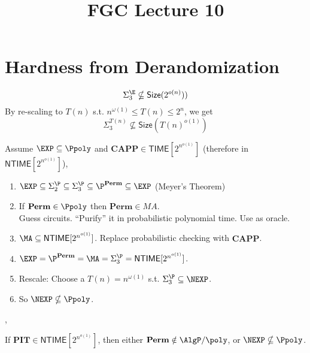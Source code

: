 \documentclass[letterpaper, 12pt]{article}
\newcommand{\Perm}{\mathbf{Perm}}
\newcommand{\CAPP}{\mathbf{CAPP}}
\newcommand{\PIT}{\mathbf{PIT}}
\newcommand{\Time}[1]{\mathsf{TIME}[#1]}
\newcommand{\NTime}[1]{\mathsf{NTIME}[#1]}
\newcommand{\Size}[1]{\mathsf{Size}(#1)}
\newcommand{\subexp}{2^{n^{o(1)}}}
\begin{document}
	\title{FGC Lecture 10}
	\date{}
	\maketitle

\section{Hardness from Derandomization}

\[\Sigma_3^\E \nsubseteq \Size{2^{o(n)})}\]
By re-scaling to $T(n)$ s.t. $n^{\omega(1)} \leq T(n) \leq 2^n$, we get
\[\Sigma_3^{T(n)} \nsubseteq \Size{T(n)^{o(1)}}\]


Assume $\EXP \subseteq \Ppoly$ and $\CAPP \in \Time{\subexp}$ (therefore in $\NTime{\subexp}$),
\begin{enumerate}[a]
	\item $\EXP \subseteq \Sigma_2^\P \subseteq \Sigma_3^\P \subseteq \P^\Perm \subseteq \EXP$ (Meyer's Theorem)
	\item If $\Perm \in \Ppoly$ then $\Perm \in MA$.\\
	Guess circuits. ``Purify'' it in probabilistic polynomial time. Use as oracle.
	\item $\MA \subseteq \NTime{\subexp}$. Replace probabilistic checking with $\CAPP$.
	\item $\EXP = \P^\Perm = \MA = \Sigma_3^\P = \NTime{\subexp}$.
	\item Rescale: Choose a $T(n) = n^{\omega(1)}$ s.t. $\Sigma_3^\P \subseteq \NEXP$.
	\item So $\NEXP \nsubseteq \Ppoly$.
\end{enumerate}

\sep

\begin{theorem}
If $\PIT \in \NTime{\subexp}$, then either $\Perm \notin \AlgP/\poly$, or $\NEXP \nsubseteq \Ppoly$.
\end{theorem}
\end{document}
